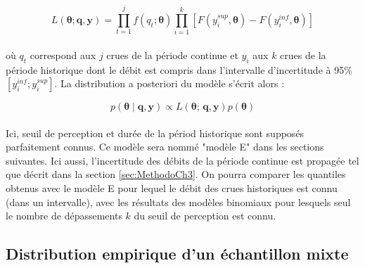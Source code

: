 \documentclass[11pt]{article}
\begin{document}
		\begin{equation}
					L(\boldsymbol{\theta} ; \boldsymbol{q}, \boldsymbol{y}) =\prod_{t=1}^j f\left(q_t;\boldsymbol{\theta}\right) \prod_{i=1}^k \left[F(y_{i}^{sup},\boldsymbol{\theta} ) - F(y_i^{inf},\boldsymbol{\theta})\right]
		\label{eq:Censure}
		\end{equation}
					
		\paragraph{}où $q_t$ correspond aux $j$ crues de la période continue et $y_i$ aux $k$ crues de la période historique dont le débit est compris dans l'intervalle d'incertitude à 95\% $\left[y_i^{inf} ; y_i^{sup}\right]$. La distribution a posteriori du modèle s'écrit alors : 
				
		\begin{equation}
			p(\boldsymbol{\theta} \mid \boldsymbol{q},\boldsymbol{y}) \propto L(\boldsymbol{\theta};\,\boldsymbol{q},\boldsymbol{y})p(\boldsymbol{\theta})
		\label{eq:Bayes_Censure}
		\end{equation}

	\paragraph{} Ici, seuil de perception et durée de la périod historique sont supposés parfaitement connus. Ce modèle sera nommé "modèle E" dans les sections suivantes. Ici aussi, l'incertitude des débits de la période continue est propagée tel que décrit dans la section \ref{sec:MethodoCh3}. On pourra comparer les quantiles obtenus avec le modèle E pour lequel le débit des crues historiques est connu (dans un intervalle), avec les résultats des modèles binomiaux pour lesquels seul le nombre de dépassements $k$ du seuil de perception est connu.
	

	\subsection{Distribution empirique d'un échantillon mixte}
	\label{subsec:DistEmpirique}
	
\end{document}
